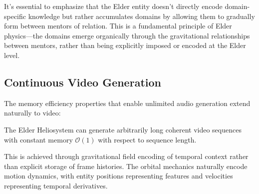 It's essential to emphasize that the Elder entity doesn't directly encode domain-specific knowledge but rather accumulates domains by allowing them to gradually form between mentors of relation. This is a fundamental principle of Elder physics—the domains emerge organically through the gravitational relationships between mentors, rather than being explicitly imposed or encoded at the Elder level.

\subsection{Continuous Video Generation}

The memory efficiency properties that enable unlimited audio generation extend naturally to video:

\begin{proposition}
The Elder Heliosystem can generate arbitrarily long coherent video sequences with constant memory $\mathcal{O}(1)$ with respect to sequence length.
\end{proposition}

This is achieved through gravitational field encoding of temporal context rather than explicit storage of frame histories. The orbital mechanics naturally encode motion dynamics, with entity positions representing features and velocities representing temporal derivatives.

